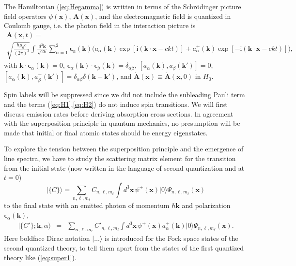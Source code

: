 \documentclass[final,3p,12pt]{elsarticle3}
\begin{document}
The Hamiltonian (\ref{eq:Hegamma}) is written in terms of the 
Schr\"o\-din\-ger picture field operators $\psi(\bm{x})$, $\bm{A}(\bm{x})$,
and the electromagnetic field is quantized in Coulomb gauge, i.e. the
photon field in the interaction picture is
\begin{multline}
\bm{A}(\bm{x},t)=\\
\sqrt{\frac{\hbar\mu_0 c}{(2\pi)^3}}
\int\!\frac{d^3\bm{k}}{\sqrt{2k}}\sum_{\alpha=1}^2
\bm{\epsilon}_\alpha(\bm{k})
\Big(
a_\alpha(\bm{k})
\exp[\mathrm{i}(\bm{k}\cdot\bm{x}-ckt)]
\label{eq:Axt}
+a_{\alpha}^+(\bm{k})
\exp[-\mathrm{i}(\bm{k}\cdot\bm{x}-ckt)]\Big),
\end{multline}
with $\bm{k}\cdot\bm{\epsilon}_\alpha(\bm{k})=0$,
$\bm{\epsilon}_\alpha(\bm{k})\cdot\bm{\epsilon}_\beta(\bm{k})=\delta_{\alpha\beta}$,
$[a_{\alpha}(\bm{k}),a_{\beta}(\bm{k}')]=0$, 
$[a_{\alpha}(\bm{k}),a_{\beta}^+(\bm{k}')]=\delta_{\alpha\beta}\delta(\bm{k}-\bm{k}')$,
and $\dot{\bm{A}}(\bm{x})\equiv\dot{\bm{A}}(\bm{x},0)$ in $H_0$.

Spin labels will be suppressed since we did not include the subleading Pauli term 
and the terms (\ref{eq:H1},\ref{eq:H2}) do not induce spin transitions.
We will first discuss emission rates before deriving absorption cross
sections. In agreement with the superposition principle in quantum mechanics,
no presumption will be made that initial or final atomic states should
be energy eigenstates.

To explore the tension between the superposition principle and the 
emergence of line spectra, we have to study the scattering matrix element for
the transition from the initial state (now written in the language of
second quantization and at $t=0$)
\begin{equation}\label{eq:lineinit}
\bm{|}\{C\}\bm{\rangle}=
\sum_{n,\ell,m_\ell}C_{n,\ell,m_\ell}\!\int\!d^3\bm{x}\,\psi^+(\bm{x})\bm{|}0\bm{\rangle}
\Psi_{n,\ell,m_\ell}(\bm{x})
\end{equation}
to the final state with an emitted photon of momentum $\hbar\bm{k}$
and polarization $\bm{\epsilon}_\alpha(\bm{k})$,
\begin{eqnarray}\nonumber
\bm{|}\{C'\};\bm{k},\alpha\bm{\rangle}&=&
\sum_{n,\ell,m_\ell}\!C'_{n,\ell,m_\ell}\!
\int\!d^3\bm{x}\,\psi^+(\bm{x})a^+_\alpha(\bm{k})\bm{|}0\bm{\rangle}
\label{eq:linefinal}
\Psi_{n,\ell,m_\ell}(\bm{x}).
\end{eqnarray}
Here boldface Dirac notation $\bm{|}\ldots\bm{\rangle}$ is introduced for 
the Fock space states of the second quantized theory, to tell them apart from
the states of the first quantized theory like (\ref{eq:super1}). 
\end{document}
